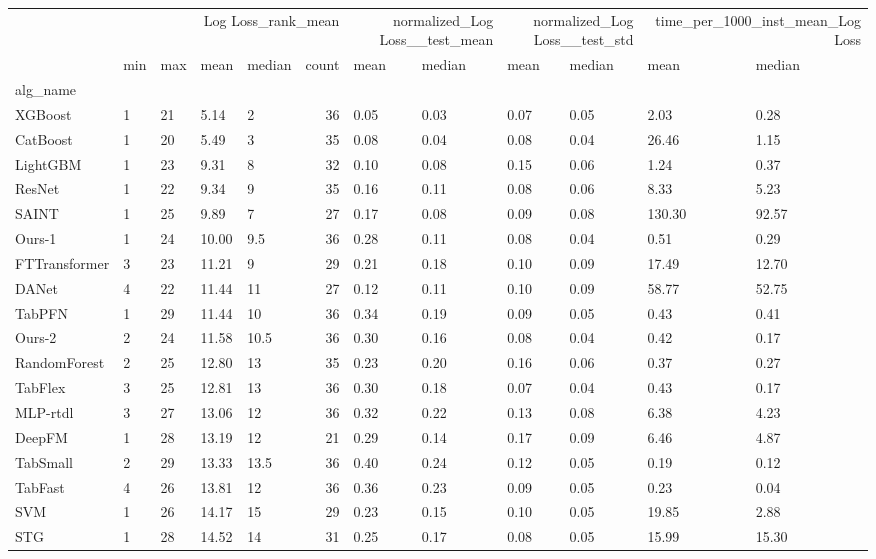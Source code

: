 \begin{tabular}{lllllrllllll}
\toprule
 & \multicolumn{5}{r}{Log Loss_rank_mean} & \multicolumn{2}{r}{normalized_Log Loss__test_mean} & \multicolumn{2}{r}{normalized_Log Loss__test_std} & \multicolumn{2}{r}{time_per_1000_inst_mean_Log Loss} \\
 & min & max & mean & median & count & mean & median & mean & median & mean & median \\
alg_name &  &  &  &  &  &  &  &  &  &  &  \\
\midrule
XGBoost & 1 & 21 & 5.14 & 2 & 36 & 0.05 & 0.03 & 0.07 & 0.05 & 2.03 & 0.28 \\
CatBoost & 1 & 20 & 5.49 & 3 & 35 & 0.08 & 0.04 & 0.08 & 0.04 & 26.46 & 1.15 \\
LightGBM & 1 & 23 & 9.31 & 8 & 32 & 0.10 & 0.08 & 0.15 & 0.06 & 1.24 & 0.37 \\
ResNet & 1 & 22 & 9.34 & 9 & 35 & 0.16 & 0.11 & 0.08 & 0.06 & 8.33 & 5.23 \\
SAINT & 1 & 25 & 9.89 & 7 & 27 & 0.17 & 0.08 & 0.09 & 0.08 & 130.30 & 92.57 \\
Ours-1 & 1 & 24 & 10.00 & 9.5 & 36 & 0.28 & 0.11 & 0.08 & 0.04 & 0.51 & 0.29 \\
FTTransformer & 3 & 23 & 11.21 & 9 & 29 & 0.21 & 0.18 & 0.10 & 0.09 & 17.49 & 12.70 \\
DANet & 4 & 22 & 11.44 & 11 & 27 & 0.12 & 0.11 & 0.10 & 0.09 & 58.77 & 52.75 \\
TabPFN & 1 & 29 & 11.44 & 10 & 36 & 0.34 & 0.19 & 0.09 & 0.05 & 0.43 & 0.41 \\
Ours-2 & 2 & 24 & 11.58 & 10.5 & 36 & 0.30 & 0.16 & 0.08 & 0.04 & 0.42 & 0.17 \\
RandomForest & 2 & 25 & 12.80 & 13 & 35 & 0.23 & 0.20 & 0.16 & 0.06 & 0.37 & 0.27 \\
TabFlex & 3 & 25 & 12.81 & 13 & 36 & 0.30 & 0.18 & 0.07 & 0.04 & 0.43 & 0.17 \\
MLP-rtdl & 3 & 27 & 13.06 & 12 & 36 & 0.32 & 0.22 & 0.13 & 0.08 & 6.38 & 4.23 \\
DeepFM & 1 & 28 & 13.19 & 12 & 21 & 0.29 & 0.14 & 0.17 & 0.09 & 6.46 & 4.87 \\
TabSmall & 2 & 29 & 13.33 & 13.5 & 36 & 0.40 & 0.24 & 0.12 & 0.05 & 0.19 & 0.12 \\
TabFast & 4 & 26 & 13.81 & 12 & 36 & 0.36 & 0.23 & 0.09 & 0.05 & 0.23 & 0.04 \\
SVM & 1 & 26 & 14.17 & 15 & 29 & 0.23 & 0.15 & 0.10 & 0.05 & 19.85 & 2.88 \\
STG & 1 & 28 & 14.52 & 14 & 31 & 0.25 & 0.17 & 0.08 & 0.05 & 15.99 & 15.30 \\

\end{tabular}
